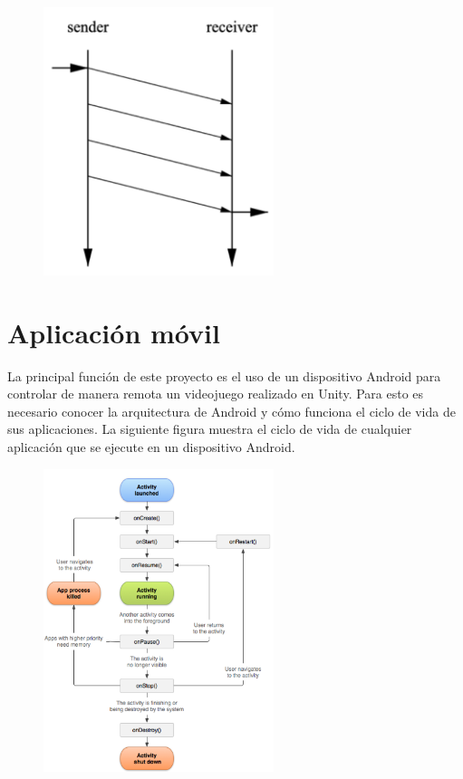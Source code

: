 \begin{figure}[h]

\centering
\includegraphics[width=0.6\textwidth]{Imagenes/Bitmap/UDP-protocol.png}
\end{figure}

\newpage
\section{Aplicaci\'on m\'ovil}
\label{cap4:sec:android}

La principal funci\'on de este proyecto es el uso de un dispositivo Android para controlar de manera remota un videojuego realizado en Unity. Para esto es necesario conocer la arquitectura de Android y c\'omo funciona el ciclo de vida de sus aplicaciones.
La siguiente figura muestra el ciclo de vida de cualquier aplicaci\'on que se ejecute en un dispositivo Android.

\begin{figure}[h]

\centering
\includegraphics[width=0.6\textwidth]{Imagenes/Bitmap/Ciclo_de_vida_Android.png}
\end{figure}

